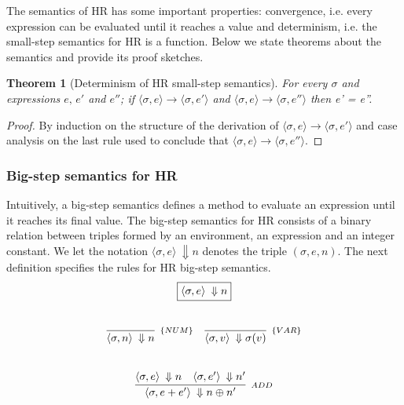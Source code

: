 \documentclass[oneside,12pt]{scrbook}
\newtheorem{Theorem}{Theorem}
\theoremstyle{definition}
\theoremstyle{plain}
\theoremstyle{definition}
\begin{document}
The semantics of HR has some important properties: convergence, i.e. every expression can be evaluated
until it reaches a value and determinism, i.e. the small-step semantics for HR is a function. Below we
state theorems about the semantics and provide its proof sketches.

\begin{Theorem}[Determinism of HR small-step semantics]
	For every $\sigma$ and expressions $e,\,e'$ and $e''$; if
	$\langle \sigma, e\rangle \to \langle \sigma, e'\rangle$ and
	$\langle \sigma, e\rangle \to \langle \sigma, e''\rangle$ then
	e' = e''.
\end{Theorem}
\begin{proof}
	By induction on the structure of the derivation of $\langle \sigma, e\rangle \to \langle \sigma, e'\rangle$ and
	case analysis on the last rule used to conclude that $\langle \sigma, e\rangle \to \langle \sigma, e''\rangle$.
\end{proof}


\subsubsection{Big-step semantics for HR}\label{subsubsection:big-step}

Intuitively, a big-step semantics defines a method to evaluate an expression until it reaches its final value.
The big-step semantics for HR consists of a binary relation between triples formed by an environment, an
expression and an integer constant. We let the notation $\langle \sigma, e \rangle\:\Downarrow n$ denotes the
triple $(\sigma, e, n)$. The next definition specifies the rules for HR big-step semantics.
\[
\begin{array}{c}
\fbox{$\langle \sigma, e \rangle\:\Downarrow n$} \\ \\ \\
\begin{array}{cc}
\infer[_{\{NUM\}}]
{\langle \sigma, n \rangle\:\Downarrow n}{} &
\infer[_{\{VAR\}}]
{\langle \sigma, v \rangle\:\Downarrow \sigma(v)}{} \\ \\ \\
\multicolumn{2}{c}{
	\infer[_{ADD}]
	{\langle \sigma, e + e' \rangle\:\Downarrow n \oplus n'}
	{\langle \sigma, e \rangle\:\Downarrow n &
		\langle \sigma, e' \rangle\:\Downarrow n'}
}
\end{array}
\end{array}
\]
\end{document}
